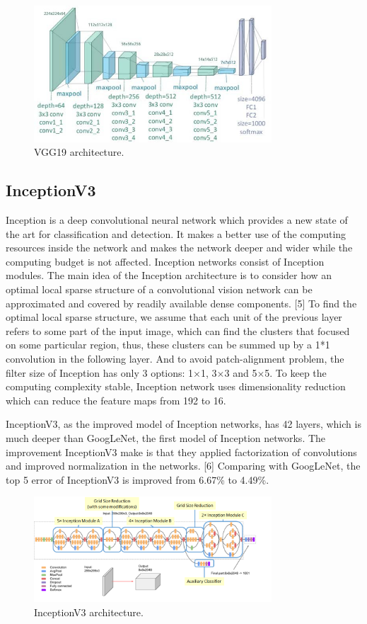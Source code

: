 \documentclass{article}
\begin{document}
\begin{figure}[H]
	\centering
	\includegraphics[width=3.5in]{pics/vgg} 
	\caption{VGG19 architecture.}
\end{figure}

\subsection{InceptionV3}

Inception is a deep convolutional neural network which provides a new state of the art for classification and detection. It makes a better use of the computing resources inside the network and makes the network deeper and wider while the computing budget is not affected. Inception networks consist of Inception modules. The main idea of the Inception architecture is to consider how an optimal local sparse structure of a convolutional vision network can be approximated and covered by readily available dense components. [5] To find the optimal local sparse structure, we assume that each unit of the previous layer refers to some part of the input image, which can find the clusters that focused on some particular region, thus, these clusters can be summed up by a 1*1 convolution in the following layer. And to avoid patch-alignment problem, the filter size of Inception has only 3 options: 1$\times$1, 3$\times$3 and 5$\times$5. To keep the computing complexity stable, Inception network uses dimensionality reduction which can reduce the feature maps from 192 to 16.

InceptionV3, as the improved model of Inception networks, has 42 layers, which is much deeper than GoogLeNet, the first model of Inception networks. The improvement InceptionV3 make is that they applied factorization of convolutions and improved normalization in the networks. [6] Comparing with GoogLeNet, the top 5 error of InceptionV3 is improved from 6.67\% to 4.49\%.


\begin{figure}[H]
	\centering
	\includegraphics[width=3.5in]{pics/inception} 
	\caption{InceptionV3 architecture.}
\end{figure}
\end{document}
